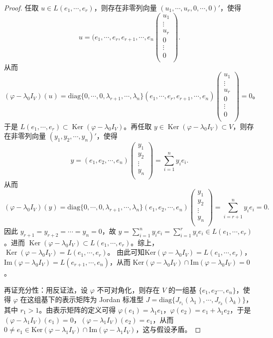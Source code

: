 \documentclass[../../main.tex]{subfiles}%
\begin{document}
\begin{proof}
任取 \(u \in L(e_1, \cdots, e_r)\)，则存在非零列向量 \((u_1, \cdots, u_r, 0, \cdots, 0)'\)，使得
\[
u=(e_1,\cdots ,e_r,e_{r+1},\cdots ,e_n\left( \begin{array}{c}
u_1\\
\vdots\\
u_r\\
0\\
\vdots\\
0\\
\end{array} \right) .
\]
从而
\[
(\varphi -\lambda _0I_V)(u)=\mathrm{diag}\{0,\cdots ,0,\lambda _{r+1},\cdots ,\lambda _n\}(e_1,\cdots ,e_r,e_{r+1},\cdots ,e_n)\left( \begin{array}{c}
u_1\\
\vdots\\
u_r\\
0\\
\vdots\\
0\\
\end{array} \right) =0\text{。}
\]
于是 \(L(e_1, \cdots, e_r) \subset \operatorname{Ker}(\varphi - \lambda_0 I_V)\)。再任取 \(y \in \operatorname{Ker}(\varphi - \lambda_0 I_V) \subset V\)，则存在非零列向量 \((y_1, y_2, \cdots, y_n)'\)，使得
\[
y=(e_1,e_2,\cdots ,e_n)\left( \begin{array}{c}
y_1\\
y_2\\
\vdots\\
y_n\\
\end{array} \right) =\sum_{i=1}^n{y_ie_i}.
\]
从而
\[
(\varphi -\lambda _0I_V)(y)=\mathrm{diag}\{0,\cdots ,0,\lambda _{r+1},\cdots ,\lambda _n\}(e_1,e_2,\cdots ,e_n)\left( \begin{array}{c}
y_1\\
y_2\\
\vdots\\
y_n\\
\end{array} \right) =\sum_{i=r+1}^n{y_ie_i}=0.
\]
因此 \(y_{r+1} = y_{r+2} = \cdots = y_n = 0\)，故 \(y = \sum_{i=1}^n y_i e_i = \sum_{i=1}^r y_i e_i \in L(e_1, \cdots, e_r)\)。进而 \(\operatorname{Ker}(\varphi - \lambda_0 I_V) \subset L(e_1, \cdots, e_r)\)。综上，\(\operatorname{Ker}(\varphi - \lambda_0 I_V) = L(e_1, \cdots, e_r)\)。
由此可知$\mathrm{Ker}(\varphi - \lambda_0I_V)=L(e_1,\cdots,e_r)$，$\mathrm{Im}(\varphi - \lambda_0I_V)=L(e_{r + 1},\cdots,e_n)$，从而 $\mathrm{Ker}(\varphi - \lambda_0I_V)\cap\mathrm{Im}(\varphi - \lambda_0I_V)=0$。

{\heiti 再证充分性：}用反证法，设 $\varphi$ 不可对角化，则存在 $V$ 的一组基 $\{e_1,e_2\cdots,e_n\}$，使得 $\varphi$ 在这组基下的表示矩阵为 Jordan 标准型 $J = \mathrm{diag}\{J_{r_1}(\lambda_1),\cdots,J_{r_k}(\lambda_k)\}$，其中 $r_1 > 1$。由表示矩阵的定义可得 $\varphi(e_1)=\lambda_1e_1$，$\varphi(e_2)=e_1 + \lambda_1e_2$，于是 $(\varphi - \lambda_1I_V)(e_1)=0$，$(\varphi - \lambda_1I_V)(e_2)=e_1$，从而 $0\neq e_1\in\mathrm{Ker}(\varphi - \lambda_1I_V)\cap\mathrm{Im}(\varphi - \lambda_1I_V)$，这与假设矛盾。
\end{proof}
\end{document}
